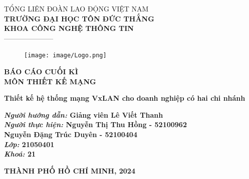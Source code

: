 \documentclass[13pt]{article}
\renewcommand{\headrulewidth}{0pt} %
\begin{document}
\newpage
	\fontsize{14pt}{20pt}\selectfont
	\begin{center}
		TỔNG LIÊN ĐOÀN LAO ĐỘNG VIỆT NAM \\\textbf{TRƯỜNG ĐẠI HỌC TÔN ĐỨC THẮNG}\\
        \textbf{KHOA CÔNG NGHỆ THÔNG TIN}\\
		---------------------
	\end{center}
	\vspace{1cm}
	\begin{figure}[h]
		\centering
		\texttt{[image: image/Logo.png]}
	\end{figure}
	\vspace{-1cm}
	\vspace{1cm}
	\fontsize{20pt}{20pt}\selectfont
	\begin{center}
		\textbf{BÁO CÁO CUỐI KÌ}\\
        \textbf{MÔN THIẾT KẾ MẠNG}
	\end{center}
	\vspace{0.5cm}
	\fontsize{16pt}{20pt}\selectfont
	\begin{center}\Huge
		\textbf{Thiết kế hệ thống mạng VxLAN cho doanh nghiệp có hai chi nhánh}	
	\end{center}
    \vspace{0.5cm}
	\fontsize{16pt}{20pt}\selectfont
	\begin{flushright}\Large
		\textbf{\textbf{\textit{Người hướng dẫn: }\textbf{Giảng viên Lê Viết Thanh }}
        \\\textbf{\textit{Người thực hiện: }\textbf{Nguyễn Thị Thu Hồng - 52100962
        \\Nguyễn Đặng Trúc Duyên - 52100404}}\\
        \textbf{\textit{Lớp: }\textbf{21050401}}\\
        \textbf{\textit{Khoá: }\textbf{21}}
        }
	\end{flushright}
	\vspace{2cm}
	\fontsize{16pt}{20pt}\selectfont
	\begin{center}
		\textbf{THÀNH PHỐ HỒ CHÍ MINH, 2024}
	\end{center}
    
\renewcommand\thesection{\arabic{section}}


\pagestyle{fancy}
\fancyhf{}
\fancyhead[C]{\thepage}
\renewcommand{\headrulewidth}{0pt} %
\end{document}
